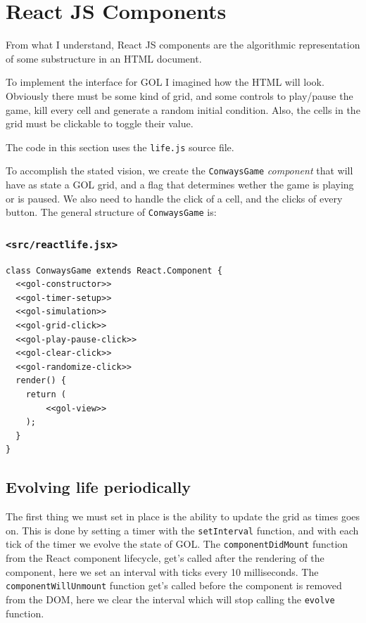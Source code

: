 \documentclass[11pt]{article}
\begin{document}
\section{React JS Components}
\label{sec:orgbbbc083}

From what I understand, React JS components are the algorithmic representation of some substructure in an HTML document.

To implement the interface for GOL I imagined how the HTML will look. Obviously there must be some kind of grid, and some controls to play/pause the game, kill every cell and generate a random initial condition. Also, the cells in the grid must be clickable to toggle their value.

The code in this section uses the \texttt{life.js} source file.

To accomplish the stated vision, we create the \texttt{ConwaysGame} \emph{component} that will have as state a GOL grid, and a flag that determines wether the game is playing or is paused. We also need to handle the click of a cell, and the clicks of every button. The general structure of \texttt{ConwaysGame} is:

\subsubsection*{\texttt{<src/reactlife.jsx>}}
\label{sec:orgb16d8f0}
\begin{verbatim}
class ConwaysGame extends React.Component {
  <<gol-constructor>>
  <<gol-timer-setup>>
  <<gol-simulation>>
  <<gol-grid-click>>
  <<gol-play-pause-click>>
  <<gol-clear-click>>
  <<gol-randomize-click>>
  render() { 
    return (
        <<gol-view>>
    );
  }
}
\end{verbatim}

\subsection{Evolving life periodically}
\label{sec:orgc6ab1a2}

The first thing we must set in place is the ability to update the grid as times goes on. This is done by setting a timer with the \texttt{setInterval} function, and with each tick of the timer we evolve the state of GOL. The \texttt{componentDidMount} function from the React component lifecycle, get's called after the rendering of the component, here we set an interval with ticks every 10 milliseconds. The \texttt{componentWillUnmount} function get's called before the component is removed from the DOM, here we clear the interval which will stop calling the \texttt{evolve} function.
\end{document}
